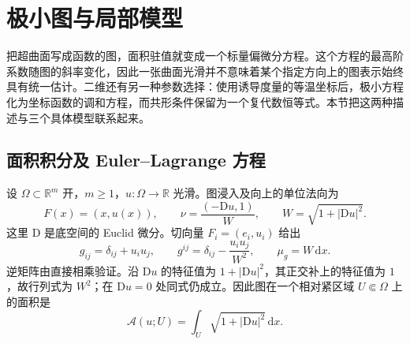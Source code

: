 
% 
% 

\section{极小图与局部模型}
\label{g3:sec:1902}

把超曲面写成函数的图，面积驻值就变成一个标量偏微分方程。这个方程的最高阶系数随图的斜率变化，因此一张曲面光滑并不意味着某个指定方向上的图表示始终具有统一估计。二维还有另一种参数选择：使用诱导度量的等温坐标后，极小方程化为坐标函数的调和方程，而共形条件保留为一个复代数恒等式。本节把这两种描述与三个具体模型联系起来。

\subsection{面积积分及 Euler–Lagrange 方程}
\label{g3:subsec:1902:01}
设 \(\Omega\subset\mathbb R^m\) 开，\(m\ge1\)，\(u:\Omega\to\mathbb R\) 光滑。图浸入及向上的单位法向为
\[
	F(x)=(x,u(x)),\qquad
	\nu=\frac{(-\mathrm Du,1)}{W},\qquad W=\sqrt{1+|\mathrm Du|^2}.
\]
这里 \(\mathrm D\) 是底空间的 Euclid 微分。切向量 \(F_i=(e_i,u_i)\) 给出
\begin{equation}\label{g3:eq:minimal-graph-metric}
	g_{ij}=\delta_{ij}+u_i u_j,\qquad
	g^{ij}=\delta_{ij}-\frac{u_i u_j}{W^2},\qquad
	\mu_g=W\,\mathrm dx.
\end{equation}
逆矩阵由直接相乘验证。沿 \(\mathrm Du\) 的特征值为 \(1+|\mathrm Du|^2\)，其正交补上的特征值为 \(1\)，故行列式为 \(W^2\)；在 \(\mathrm Du=0\) 处同式仍成立。因此图在一个相对紧区域 \(U\Subset\Omega\) 上的面积是
\[
	\mathcal A(u;U)=\int_U\sqrt{1+|\mathrm Du|^2}\,\mathrm dx.
\]

